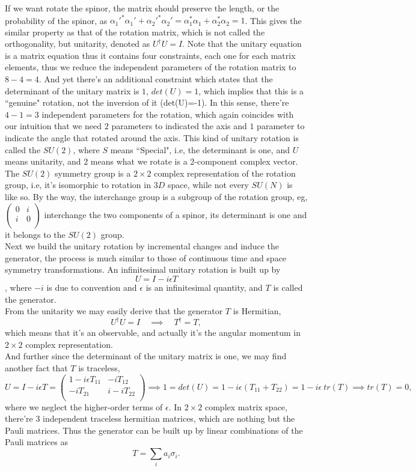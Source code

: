 \documentclass{article}
\newcommand{\be}{\begin{equation}}
\newcommand{\ee}{\end{equation}}
\newcommand{\ba}{\begin{array}}
\newcommand{\ea}{\end{array}}
\renewcommand{\1}{\left}
\renewcommand{\2}{\right}
\newcommand{\al}{\alpha}
\newcommand{\sig}{\sigma}
\newcommand{\ep}{\epsilon}
\begin{document}
If we want rotate the spinor, the matrix should preserve the length, or the probability of the spinor, as $\al_1'^*\al_1'+\al_2'^*\al_2'=\al_1^*\al_1+\al_2^*\al_2=1$. This gives the similar property as that of the rotation matrix, which is not called the orthogonality, but unitarity, denoted as $U^\dag U=I$. Note that the unitary equation is a matrix equation thus it contains four constraints, each one for each matrix elements, thus we reduce the independent parameters of the rotation matrix to $8-4=4$. And yet there's an additional constraint which states that the determinant of the unitary matrix is $1$, $det(U)=1$, which implies that this is a ``genuine" rotation, not the inversion of it (det(U)=-1). In this sense, there're $4-1=3$ independent parameters for the rotation, which again coincides with our intuition that we need $2$ parameters to indicated the axis and $1$ parameter to indicate the angle that rotated around the axis. This kind of unitary rotation is called the $SU(2)$, where $S$ means ``Special", i.e, the determinant is one, and $U$ means unitarity, and $2$ means what we rotate is a $2$-component complex vector. The $SU(2)$ symmetry group is a $2\times 2$ complex representation of the rotation  group, i.e, it's isomorphic to rotation in $3D$ space, while not every $SU(N)$ is like so. By the way, the interchange group is a subgroup of the rotation group, eg, $\1(\begin{array}{cc}0&i\\i&0\\\end{array}\2)$ interchange  the two components of a spinor, its determinant is one and it belongs to the $SU(2)$ group.\\

Next we build the unitary rotation by incremental changes and induce the generator, the process is much similar to those of  continuous time and space symmetry transformations. An infinitesimal unitary rotation is built up by
\be
U=I-i\ep T
\ee,
where $-i$ is due to convention and $\ep$ is an infinitesimal quantity, and $T$ is called the generator.\\
From the unitarity we may easily derive that the generator $T$ is Hermitian,
\be
U^\dag U=I \quad\implies\quad T^\dag=T,
\ee
which means that it's an observable, and actually it's the angular momentum in $2\times 2$ complex representation.\\
And further since the determinant of the unitary matrix is one, we may find another fact that $T$ is traceless,
\be
U=I-i\ep T=\1(\ba{cc}1-i\ep T_{11}&-iT_{12}\\-iT_{21}&i-iT_{22}\\\ea\2) \implies 1=det(U)=1-i\ep(T_{11}+T_{22})=1-i\ep\ tr(T) \implies tr(T)=0,
\ee
where we neglect the higher-order terms of $\ep$. In $2\times 2$ complex matrix space, there're $3$ independent traceless hermitian matrices, which are nothing but the Pauli matrices. Thus the generator can be built up by linear combinations of the Pauli matrices as
\be T=\sum_i a_i \sig_i. \ee
\end{document}
